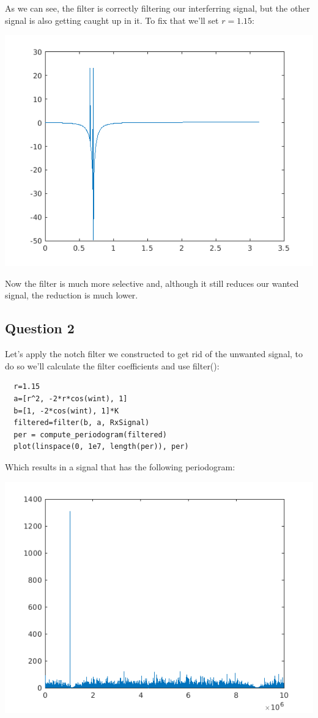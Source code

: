 \documentclass[conference,9pt]{IEEEtran}
\begin{document}
As we can see, the filter is correctly filtering our interferring signal, but the other signal is also getting caught up in it. To fix that we'll set $r=1.15$:

\includegraphics[scale=0.6]{r1-1.png}

Now the filter is much more selective and, although it still reduces our wanted signal, the reduction is much lower.

\subsection{Question 2}
Let's apply the notch filter we constructed to get rid of the unwanted signal, to do so we'll calculate the filter coefficients and use filter():
\begin{verbatim}
  r=1.15
  a=[r^2, -2*r*cos(wint), 1]
  b=[1, -2*cos(wint), 1]*K
  filtered=filter(b, a, RxSignal)
  per = compute_periodogram(filtered)
  plot(linspace(0, 1e7, length(per)), per)
\end{verbatim}

Which results in a signal that has the following periodogram:

\includegraphics[scale=0.6]{filtered.png}
\end{document}
